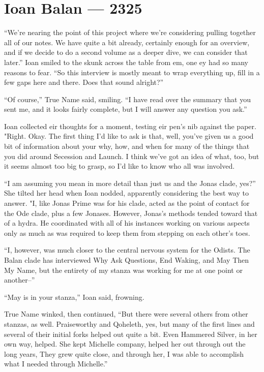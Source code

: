 \hypertarget{ioan-balan-2325}{%
\chapter{Ioan Balan — 2325}\label{ioan-balan-2325}}

``We're nearing the point of this project where we're considering pulling together all of our notes. We have quite a bit already, certainly enough for an overview, and if we decide to do a second volume as a deeper dive, we can consider that later.'' Ioan smiled to the skunk across the table from em, one ey had so many reasons to fear. ``So this interview is mostly meant to wrap everything up, fill in a few gaps here and there. Does that sound alright?''

``Of course,'' True Name said, smiling. ``I have read over the summary that you sent me, and it looks fairly complete, but I will answer any question you ask.''

Ioan collected eir thoughts for a moment, testing eir pen's nib against the paper. "Right. Okay. The first thing I'd like to ask is that, well, you've given us a good bit of information about your why, how, and when for many of the things that you did around Secession and Launch. I think we've got an idea of what, too, but it seems almost too big to grasp, so I'd like to know who all was involved.

``I am assuming you mean in more detail than just us and the Jonas clade, yes?'' She tilted her head when Ioan nodded, apparently considering the best way to answer. "I, like Jonas Prime was for his clade, acted as the point of contact for the Ode clade, plus a few Jonases. However, Jonas's methods tended toward that of a hydra. He coordinated with all of his instances working on various aspects only as much as was required to keep them from stepping on each other's toes.

``I, however, was much closer to the central nervous system for the Odists. The Balan clade has interviewed Why Ask Questions, End Waking, and May Then My Name, but the entirety of my stanza was working for me at one point or another--''

``May is in your stanza,'' Ioan said, frowning.

True Name winked, then continued, ``But there were several others from other stanzas, as well. Praiseworthy and Qoheleth, yes, but many of the first lines and several of their initial forks helped out quite a bit. Even Hammered Silver, in her own way, helped. She kept Michelle company, helped her out through out the long years, They grew quite close, and through her, I was able to accomplish what I needed through Michelle.''

